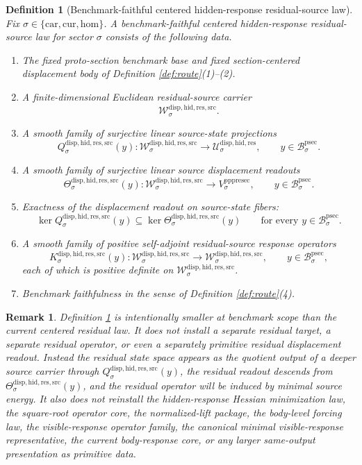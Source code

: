 \documentclass[11pt]{article}
\newcommand{\Car}{\mathrm{car}}
\newcommand{\Cur}{\mathrm{cur}}
\newcommand{\Hom}{\mathrm{hom}}
\newcommand{\ProtoSectionBody}[1]{\mathcal B_{#1}^{\mathrm{psec}}}
\newcommand{\PrePreProtoSectionVertical}[1]{V_{#1}^{\mathrm{pppresec}}}
\newcommand{\ResidualState}[1]{\mathcal U_{#1}^{\mathrm{disp,hid,res}}}
\newcommand{\ResidualSourceCarrier}[1]{\mathcal W_{#1}^{\mathrm{disp,hid,res,src}}}
\newcommand{\ResidualSourceProjection}[1]{Q_{#1}^{\mathrm{disp,hid,res,src}}}
\newcommand{\ResidualSourceReadout}[1]{\Theta_{#1}^{\mathrm{disp,hid,res,src}}}
\newcommand{\ResidualSourceOperator}[1]{K_{#1}^{\mathrm{disp,hid,res,src}}}
\newtheorem{definition}{Definition}
\newtheorem{remark}{Remark}
\begin{document}
\begin{definition}[Benchmark-faithful centered hidden-response residual-source law]
\label{def:source}
Fix \(\sigma\in\{\Car,\Cur,\Hom\}\). A \emph{benchmark-faithful centered hidden-response residual-source law} for sector \(\sigma\) consists of the following data.
\begin{enumerate}
    \item The fixed proto-section benchmark base and fixed section-centered displacement body of Definition \ref{def:route}(1)--(2).
    \item A finite-dimensional Euclidean residual-source carrier
    \[
    \ResidualSourceCarrier{\sigma}.
    \]
    \item A smooth family of surjective linear source-state projections
    \[
    \ResidualSourceProjection{\sigma}(y):
    \ResidualSourceCarrier{\sigma}\to\ResidualState{\sigma},
    \qquad
    y\in\ProtoSectionBody{\sigma}.
    \]
    \item A smooth family of surjective linear source displacement readouts
    \[
    \ResidualSourceReadout{\sigma}(y):
    \ResidualSourceCarrier{\sigma}\to\PrePreProtoSectionVertical{\sigma},
    \qquad
    y\in\ProtoSectionBody{\sigma}.
    \]
    \item Exactness of the displacement readout on source-state fibers:
    \[
    \ker \ResidualSourceProjection{\sigma}(y)
    \subseteq
    \ker \ResidualSourceReadout{\sigma}(y)
    \qquad
    \text{for every }
    y\in\ProtoSectionBody{\sigma}.
    \]
    \item A smooth family of positive self-adjoint residual-source response operators
    \[
    \ResidualSourceOperator{\sigma}(y):
    \ResidualSourceCarrier{\sigma}\to\ResidualSourceCarrier{\sigma},
    \qquad
    y\in\ProtoSectionBody{\sigma},
    \]
    each of which is positive definite on \(\ResidualSourceCarrier{\sigma}\).
    \item Benchmark faithfulness in the sense of Definition \ref{def:route}(4).
\end{enumerate}
\end{definition}

\begin{remark}
Definition \ref{def:source} is intentionally smaller at benchmark scope than the current centered residual law. It does not install a separate residual target, a separate residual operator, or even a separately primitive residual displacement readout. Instead the residual state space appears as the quotient output of a deeper source carrier through \(\ResidualSourceProjection{\sigma}(y)\), the residual readout descends from \(\ResidualSourceReadout{\sigma}(y)\), and the residual operator will be induced by minimal source energy. It also does not reinstall the hidden-response Hessian minimization law, the square-root operator core, the normalized-lift package, the body-level forcing law, the visible-response operator family, the canonical minimal visible-response representative, the current body-response core, or any larger same-output presentation as primitive data.
\end{remark}
\end{document}

